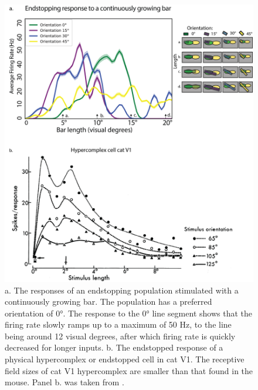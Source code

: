 \documentclass[12pt]{article}
\begin{document}
  \begin{figure}[H]
    \centering
    \includegraphics[width=1.0 \textwidth]{adjusted_figures/endstop_line_length_physiology.png}
    \caption{a. The responses of an endstopping population stimulated with a continuously growing bar. The population has a preferred orientation of 0°. The response to the 0° line segment shows that the firing rate slowly ramps up to a maximum of 50 Hz, to the line being around 12 visual degrees, after which firing rate is quickly decreased for longer inputs. b. The endstopped response of a physical hypercomplex or endstopped cell in cat V1. The receptive field sizes of cat V1 hypercomplex are smaller than that found in the mouse. Panel b. was taken from \textcite{orbanDimensionsPropertiesEndzone1979}.}
    \label{fig:endstopping_length}
  \end{figure}
\end{document}
